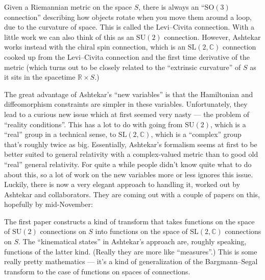 \documentclass{article}
\renewcommand{\texttt}[1]{%
  \begingroup
  \ttfamily
  \begingroup\lccode`~=`/\lowercase{\endgroup\def~}{/\discretionary{}{}{}}%
  \begingroup\lccode`~=`[\lowercase{\endgroup\def~}{[\discretionary{}{}{}}%
  \begingroup\lccode`~=`.\lowercase{\endgroup\def~}{.\discretionary{}{}{}}%
  \catcode`/=\active\catcode`[=\active\catcode`.=\active
  \scantokens{#1\noexpand}%
  \endgroup
}
\begin{document}
Given a Riemannian metric on the space \(S\), there is always an
``\(\mathrm{SO}(3)\) connection'' describing how objects rotate when you
move them around a loop, due to the curvature of space. This is called
the Levi--Civita connection. With a little work we can also think of this
as an \(\mathrm{SU}(2)\) connection. However, Ashtekar works instead
with the chiral spin connection, which is an
\(\mathrm{SL}(2,\mathbb{C})\) connection cooked up from the Levi--Civita
connection and the first time derivative of the metric (which turns out
to be closely related to the ``extrinsic curvature'' of \(S\) as it sits
in the spacetime \(\mathbb{R} \times S\).)

The great advantage of Ashtekar's ``new variables'' is that the
Hamiltonian and diffeomorphism constraints are simpler in these
variables. Unfortunately, they lead to a curious new issue which at
first seemed very nasty --- the problem of ``reality conditions''. This
has a lot to do with going from \(\mathrm{SU}(2)\), which is a ``real''
group in a technical sense, to \(\mathrm{SL}(2,\mathbb{C})\), which is a
``complex'' group that's roughly twice as big. Essentially, Ashtekar's
formalism seems at first to be better suited to general relativity with
a complex-valued metric than to good old ``real'' general relativity.
For quite a while people didn't know quite what to do about this, so a
lot of work on the new variables more or less ignores this issue.
Luckily, there is now a very elegant approach to handling it, worked out
by Ashtekar and collaborators. They are coming out with a couple of
papers on this, hopefully by mid-November:

\noindent
The first paper constructs a kind of transform that takes functions on
the space of \(\mathrm{SU}(2)\) connections on \(S\) into functions on
the space of \(\mathrm{SL}(2,\mathbb{C})\) connections on \(S\). The
``kinematical states'' in Ashtekar's approach are, roughly speaking,
functions of the latter kind. (Really they are more like ``measures''.)
This is some really pretty mathematics --- it's a kind of generalization
of the Bargmann--Segal transform to the case of functions on spaces of
connections.
\end{document}
